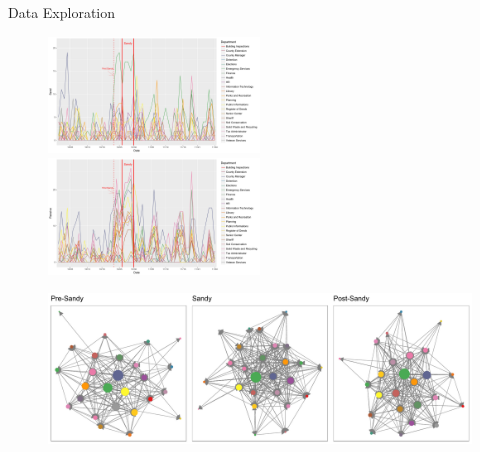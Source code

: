 \documentclass[10pt, xcolor=table]{beamer}
\theoremstyle{definition}
\theoremstyle{remark}
\begin{document}
\begin{frame}{Data Exploration}
\begin{center}
\begin{minipage}{0.75\linewidth}
	 	 \begin{figure}
	 	 	\includegraphics[width=0.5\textwidth, trim = 0cm 0cm 6cm 0cm, clip=true]{figures/DareSend.pdf}
	 	 	\includegraphics[width=0.5\textwidth, trim = 0cm 0cm 6cm 0cm, clip=true]{figures/DareReceive.pdf}
	 	 \end{figure}	\vspace{-.5cm}
	 \begin{figure}
	 		 	\includegraphics[width=1\textwidth]{figures/DareNetwork.pdf}
	 		 		 \end{figure}
\end{minipage}
\begin{minipage}{0.13\linewidth}
		 \begin{figure}

\end{figure}
\end{minipage}
\end{center}
\end{frame}
\end{document}
